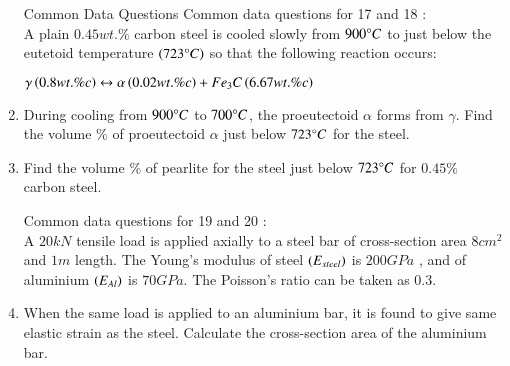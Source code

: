 \documentclass[journal]{IEEEtran}
\begin{document}
\begin{enumerate}[start=10]
Common Data Questions 
Common data questions for 17 and 18 :\\
A plain $0.45 wt.\% $ carbon steel is cooled slowly from $900 \degree C$ to just below the eutetoid temperature $\left(723 \degree C\right)$ so that the following reaction occurs: 
\begin{center}
    $\gamma \left(0.8 wt.\% c\right) \leftrightarrow \alpha \left(0.02 wt.\% c\right) + Fe_3C\left(6.67 wt.\% c\right)$
\end{center}
\item %
During cooling from $900 \degree C$ to $700 \degree C$, the proeutectoid $\alpha$ forms from $\gamma$. Find the volume \% of proeutectoid $\alpha $ just below $723 \degree C$ for the steel.
\begin{enumerate}
\end{enumerate}

\item %
Find the volume \% of pearlite for the steel just below $723 \degree C$ for $0.45 \%$ carbon steel.
\begin{enumerate}
\end{enumerate}

Common data questions for 19 and 20 :\\
A $20kN$ tensile load is applied axially to a steel bar of cross-section area $8 cm^2$ and $1m$ length. The Young's modulus of steel $\left(E_{steel}\right)$ is $200GPa$ , and of aluminium $\left(E_{Al}\right)$ is $70 GPa$. The Poisson's ratio  can be taken as 0.3.

\item %
When the same load is applied to an aluminium bar, it is found to give same elastic strain as the steel. Calculate the cross-section area of the aluminium bar.
\begin{enumerate}
\end{enumerate}


\end{enumerate}
\end{document}
